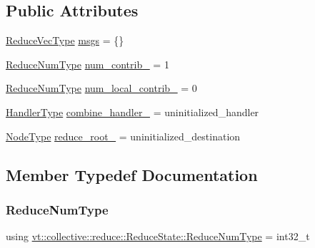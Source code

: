 \subsection*{Public Attributes}
\begin{DoxyCompactItemize}
\item 
\hyperlink{structvt_1_1collective_1_1reduce_1_1_reduce_state_afea0a5b0e2cdfd86417394d044e440db}{Reduce\+Vec\+Type} \hyperlink{structvt_1_1collective_1_1reduce_1_1_reduce_state_afded8bde5c4b8e5aebf6000c7efb9514}{msgs} = \{\}
\item 
\hyperlink{structvt_1_1collective_1_1reduce_1_1_reduce_state_ae83d217c90b8a8895ca998d7ea9c49e4}{Reduce\+Num\+Type} \hyperlink{structvt_1_1collective_1_1reduce_1_1_reduce_state_ad35cc97dda033eb3e933241e5436f224}{num\+\_\+contrib\+\_\+} = 1
\item 
\hyperlink{structvt_1_1collective_1_1reduce_1_1_reduce_state_ae83d217c90b8a8895ca998d7ea9c49e4}{Reduce\+Num\+Type} \hyperlink{structvt_1_1collective_1_1reduce_1_1_reduce_state_a9aa48263112ed8e0b5033c002dc28ef2}{num\+\_\+local\+\_\+contrib\+\_\+} = 0
\item 
\hyperlink{namespacevt_af64846b57dfcaf104da3ef6967917573}{Handler\+Type} \hyperlink{structvt_1_1collective_1_1reduce_1_1_reduce_state_a56a06e0fb95b81c3848092a49a9b0841}{combine\+\_\+handler\+\_\+} = uninitialized\+\_\+handler
\item 
\hyperlink{namespacevt_a866da9d0efc19c0a1ce79e9e492f47e2}{Node\+Type} \hyperlink{structvt_1_1collective_1_1reduce_1_1_reduce_state_a9cfb8bd6b25ce42e17b30507de8eb6da}{reduce\+\_\+root\+\_\+} = uninitialized\+\_\+destination
\end{DoxyCompactItemize}


\subsection{Member Typedef Documentation}
\mbox{\label{structvt_1_1collective_1_1reduce_1_1_reduce_state_ae83d217c90b8a8895ca998d7ea9c49e4}} 
\subsubsection{\texorpdfstring{Reduce\+Num\+Type}{ReduceNumType}}
{\footnotesize\ttfamily using \hyperlink{structvt_1_1collective_1_1reduce_1_1_reduce_state_ae83d217c90b8a8895ca998d7ea9c49e4}{vt\+::collective\+::reduce\+::\+Reduce\+State\+::\+Reduce\+Num\+Type} =  int32\+\_\+t}

